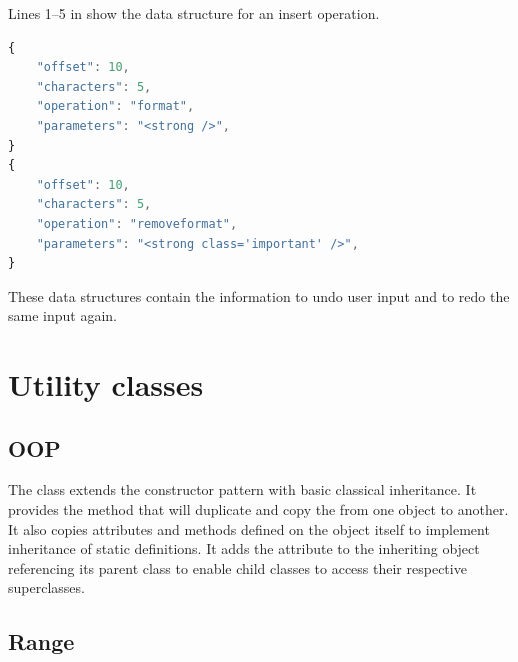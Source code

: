 Lines 1--5 in  show the data structure for an insert operation.

\begin{lstlisting}[language=JavaScript, caption={Change data structure}, label=lst:format_structure]
{
    "offset": 10,
    "characters": 5,
    "operation": "format",
    "parameters": "<strong />",
}
{
    "offset": 10,
    "characters": 5,
    "operation": "removeformat",
    "parameters": "<strong class='important' />",
}
\end{lstlisting}

These data structures contain the information to undo user input and to redo the same input again.


\section{Utility classes}

\subsection{OOP}
\label{sec:oop_class}

The  class extends the constructor pattern with basic classical inheritance. It provides the method  that will duplicate and copy the  from one  object to another. It also copies attributes and methods defined on the  object itself to implement inheritance of static definitions. It adds the attribute  to the inheriting  object referencing its parent class to enable child classes to access their respective superclasses.




\subsection{Range}

